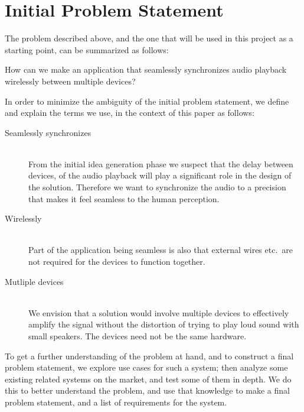 \section{Initial Problem Statement}\label{sec:initial_problem}

The problem described above, and the one that will be used
in this project as a starting point, can be summarized as follows:

\begin{problemstatement}
    How can we make an application that seamlessly synchronizes audio
    playback wirelessly between multiple devices?
\end{problemstatement}

\noindent
In order to minimize the ambiguity of the initial problem statement,
we define and explain the terms we use, in the context of this paper as follows:

\begin{description}
    \item[Seamlessly synchronizes]  \hfill \\
        From the initial idea generation phase we suspect
        that the delay between devices, of the audio playback will
        play a significant role in the design of the solution. Therefore we
        want to synchronize the audio to a precision that makes it feel
        seamless to the human perception.
    \item[Wirelessly]  \hfill \\
        Part of the application being seamless is also that external wires etc.\ are
        not required for the devices to function together.
    \item[Mutliple devices]  \hfill \\
        We envision that a solution would involve multiple devices to effectively
        amplify the signal without the distortion of trying to play loud sound with
        small speakers. The devices need not be the same hardware.
\end{description}

To get a further understanding of the problem at hand, and to
construct a final problem statement, we explore use cases for such a system;
then analyze some existing related systems on the market,
and test some of them in depth.
We do this to better understand the problem, and use that knowledge
to make a final problem statement, and a list of requirements for the system.
